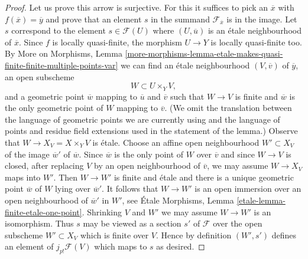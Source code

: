 \begin{proof}
\medskip\noindent
Let us prove this arrow is surjective. For this it suffices to pick
an $\overline{x}$ with $f(\overline{x}) = \overline{y}$ and prove that
an element $s$ in the summand $\mathcal{F}_{\overline{x}}$ is in the
image. Let $s$ correspond to the element $s \in \mathcal{F}(U)$
where $(U, \overline{u})$ is an \'etale neighbourhood of $\overline{x}$.
Since $f$ is locally quasi-finite, the morphism $U \to Y$
is locally quasi-finite too. By More on Morphisms, Lemma
\ref{more-morphisms-lemma-etale-makes-quasi-finite-finite-multiple-points-var}
we can find an \'etale neighbourhood $(V, \overline{v})$ of
$\overline{y}$, an open subscheme
$$
W \subset U \times_Y V,
$$
and a geometric point $\overline{w}$ mapping to $\overline{u}$ and
$\overline{v}$ such that $W \to V$ is finite and $\overline{w}$ is the
only geometric point of $W$ mapping to $\overline{v}$. (We omit the translation
between the language of geometric points we are currently using and the
language of points and residue field extensions used in the
statement of the lemma.) Observe that $W \to X_V = X \times_Y V$
is \'etale. Choose an affine open neighbourhood $W' \subset X_V$
of the image $\overline{w}'$ of $\overline{w}$. Since $\overline{w}$
is the only point of $W$ over $\overline{v}$ and since $W \to V$
is closed, after replacing $V$ by an open neighbourhood of $\overline{v}$,
we may assume $W \to X_V$ maps into $W'$. Then $W \to W'$ is finite and
\'etale and there is a unique geometric point $\overline{w}$ of $W$
lying over $\overline{w}'$. It follows that $W \to W'$ is an open immersion
over an open neighbourhood of $\overline{w}'$ in $W'$, see
\'Etale Morphisms, Lemma \ref{etale-lemma-finite-etale-one-point}.
Shrinking $V$ and $W'$ we may assume $W \to W'$ is an isomorphism.
Thus $s$ may be viewed as a section $s'$ of $\mathcal{F}$ over
the open subscheme $W' \subset X_V$ which is finite over $V$.
Hence by definition $(W', s')$ defines an element of $j_{p!}\mathcal{F}(V)$
which maps to $s$ as desired.


\end{proof}
